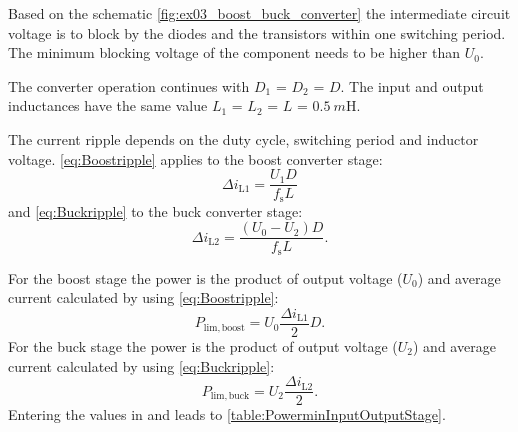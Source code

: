 
\begin{solutionblock}
    Based on the schematic \autoref{fig:ex03_boost_buck_converter} the intermediate circuit voltage is to block by the diodes and 
    the transistors within one switching period. The minimum blocking voltage of the component needs to be higher than $U_\mathrm{0}$.
\end{solutionblock}

\vspace{2em}\par
The converter operation continues with $D_\mathrm{1}$ = $D_\mathrm{2}$ = $D$. The input and output inductances 
have the same value $L_\mathrm{1}$ = $L_\mathrm{2}$ = $L$ = $\SI{0.5}{m\henry}$.


\begin{solutionblock}
    The current ripple depends on the duty cycle, switching period and inductor voltage.
    \eqref{eq:Boostripple} applies to the boost converter stage:
    \begin{equation}
        \Delta i_\mathrm{L1}=\frac{U_\mathrm{1}D}{f_\mathrm{s}L}
        \label{eq:Boostripple}
    \end{equation}
    and \eqref{eq:Buckripple} to the buck converter stage:
    \begin{equation}
        \Delta i_\mathrm{L2}=\frac{\left(U_\mathrm{0}-U_\mathrm{2}\right)D}{f_\mathrm{s}L}.
        \label{eq:Buckripple}
    \end{equation}
\end{solutionblock}


\begin{solutionblock}
    For the boost stage the power is the product of output voltage
     ($U_\mathrm{0}$) and average current calculated by using \eqref{eq:Boostripple}:
    \begin{equation}
        P_\mathrm{lim,boost}=U_\mathrm{0}\frac{\Delta i_\mathrm{L1}}{2}D.
    \end{equation}
    For the buck stage the power is the product of output voltage
    ($U_\mathrm{2}$) and average current calculated by using \eqref{eq:Buckripple}:
    \begin{equation}
        P_\mathrm{lim,buck}=U_\mathrm{2}\frac{\Delta i_\mathrm{L2}}{2}.
    \end{equation}
    Entering the values in \label{eq:Boostripple} and \label{eq:Buckripple} leads to \autoref{table:PowerminInputOutputStage}.
        
\end{solutionblock}

